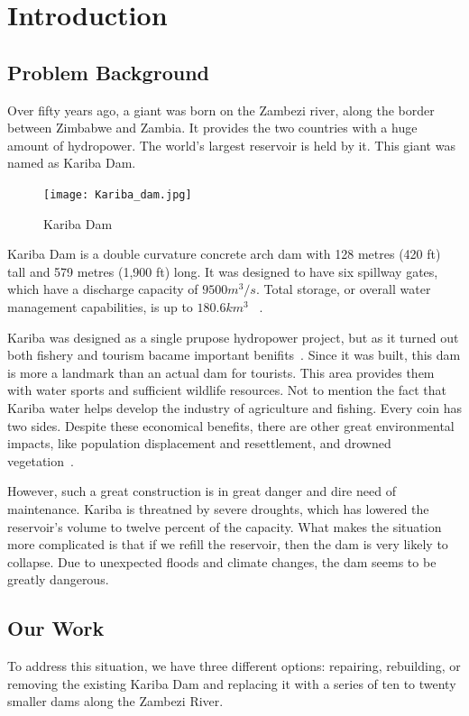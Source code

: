 \documentclass{mcmthesis}
\begin{document}
\newpage
\section{Introduction}	
\subsection{Problem Background}
	Over fifty years ago, a giant was born on the Zambezi river, along the border between Zimbabwe and Zambia. It provides the two countries with a huge amount of hydropower. The world's largest reservoir is held by it. This giant was named as Kariba Dam.
\begin{figure}[h]
    \centering
    \texttt{[image: Kariba\_dam.jpg]}
    \caption{Kariba Dam~\cite{Wiki_Kariba}}
    \label{fig:dam}
\end{figure}

Kariba Dam is a double curvature concrete arch dam with 128 metres (420 ft) tall and 579 metres (1,900 ft) long. It was designed to have six spillway gates, which have a discharge capacity of $9500m^3/s$. Total storage, or overall water management capabilities, is up to $180.6km^3$ ~\cite{WCD_Dam}.

Kariba was designed as a single prupose hydropower project, but as it turned out both fishery and tourism bacame important benifits~\cite{WCD_Dam}. Since it was built, this dam is more a landmark than an actual dam for tourists. This area provides them with water sports and sufficient wildlife resources. Not to mention the fact that Kariba water helps develop the industry of agriculture and fishing. Every coin has two sides. Despite these economical benefits, there are other great environmental impacts, like population displacement and resettlement, and drowned vegetation~\cite{Wiki_Kariba}.

However, such a great construction is in great danger and dire need of maintenance. Kariba is threatned by severe droughts, which has lowered the reservoir's volume to twelve percent of the capacity. What makes the situation more complicated is that if we refill the reservoir, then the dam is very likely to collapse. Due to unexpected floods and climate changes, the dam seems to be greatly dangerous.
\subsection{Our Work}
To address this situation, we have three different options: repairing, rebuilding, or removing the existing Kariba Dam and replacing it with a series of ten to twenty smaller dams along the Zambezi River.
\end{document}
